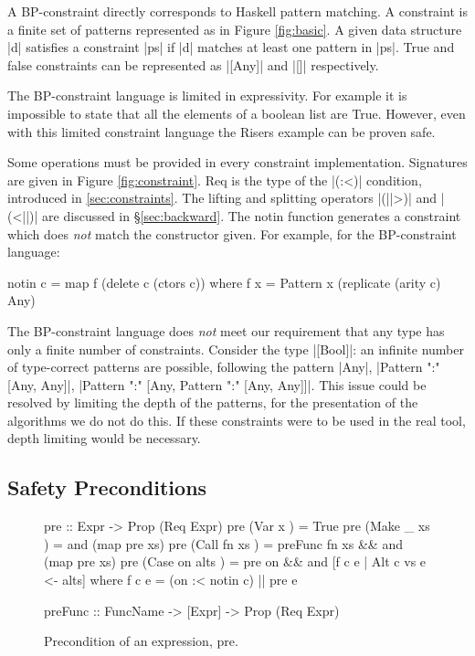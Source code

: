 \documentclass[preprint]{sigplanconf}
\newcommand{\C}[1]{\textsf{#1}}
\begin{document}
A BP-constraint directly corresponds to Haskell pattern matching. A constraint is a finite set of patterns represented as in Figure \ref{fig:basic}. A given data structure |d| satisfies a constraint |ps| if |d| matches at least one pattern in |ps|. True and false constraints can be represented as |[Any]| and |[]| respectively.

The BP-constraint language is limited in expressivity. For example it is impossible to state that all the elements of a boolean list are True. However, even with this limited constraint language the Risers example can be proven safe.

Some operations must be provided in every constraint implementation. Signatures are given in Figure \ref{fig:constraint}. \C{Req} is the type of the |(:<)| condition, introduced in \ref{sec:constraints}. The lifting and splitting operators |(||>)| and |(<||)| are discussed in \S\ref{sec:backward}. The \C{notin} function generates a constraint which does \textit{not} match the constructor given. For example, for the BP-constraint language:

\begin{code}
notin c = map f (delete c (ctors c))
   where f x = Pattern x (replicate (arity c) Any)
\end{code}

The BP-constraint language does \textit{not} meet our requirement that any type has only a finite number of constraints. Consider the type |[Bool]|: an infinite number of type-correct patterns are possible, following the pattern |Any|, |Pattern ":" [Any, Any]|, |Pattern ":" [Any, Pattern ":" [Any, Any]]|. This issue could be resolved by limiting the depth of the patterns, for the presentation of the algorithms we do not do this. If these constraints were to be used in the real tool, depth limiting would be necessary.

\subsection{Safety Preconditions}
\label{sec:precond}

\begin{figure}
\begin{code}
pre :: Expr -> Prop (Req Expr)
pre (Var   x         ) = True
pre (Make  _   xs    ) = and (map pre xs)
pre (Call  fn  xs    ) = preFunc fn xs && and (map pre xs)
pre (Case  on  alts  ) = pre on && and [f c e | Alt c vs e <- alts]
    where f c e = (on :< notin c) || pre e

preFunc :: FuncName -> [Expr] -> Prop (Req Expr)
\end{code}
\caption{Precondition of an expression, \C{pre}.}
\label{fig:precondition}
\end{figure}
\end{document}
